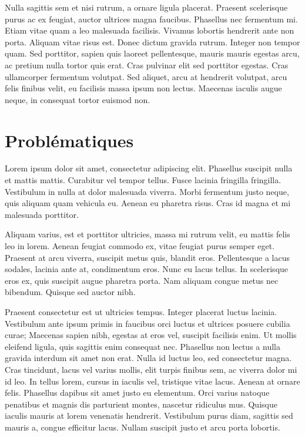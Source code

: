 Nulla sagittis sem et nisi rutrum, a ornare ligula placerat. Praesent scelerisque purus ac ex feugiat, auctor ultrices magna faucibus. 
Phasellus nec fermentum mi. Etiam vitae quam a leo malesuada facilisis. Vivamus lobortis hendrerit ante non porta. 
Aliquam vitae risus est. Donec dictum gravida rutrum. Integer non tempor quam. 
Sed porttitor, sapien quis laoreet pellentesque, mauris mauris egestas arcu, ac pretium nulla tortor quis erat. 
Cras pulvinar elit sed porttitor egestas. Cras ullamcorper fermentum volutpat. 
Sed aliquet, arcu at hendrerit volutpat, arcu felis finibus velit, eu facilisis massa ipsum non lectus. 
Maecenas iaculis augue neque, in consequat tortor euismod non. 

\section{Problématiques}

Lorem ipsum dolor sit amet, consectetur adipiscing elit. Phasellus suscipit nulla et mattis mattis. Curabitur vel tempor tellus. 
Fusce lacinia fringilla fringilla. Vestibulum in nulla at dolor malesuada viverra. Morbi fermentum justo neque, quis aliquam quam vehicula eu. 
Aenean eu pharetra risus. Cras id magna et mi malesuada porttitor.

Aliquam varius, est et porttitor ultricies, massa mi rutrum velit, eu mattis felis leo in lorem. 
Aenean feugiat commodo ex, vitae feugiat purus semper eget. Praesent at arcu viverra, suscipit metus quis, blandit eros. 
Pellentesque a lacus sodales, lacinia ante at, condimentum eros. Nunc eu lacus tellus. In scelerisque eros ex, quis suscipit augue pharetra porta. 
Nam aliquam congue metus nec bibendum. Quisque sed auctor nibh.

Praesent consectetur est ut ultricies tempus. Integer placerat luctus lacinia. 
Vestibulum ante ipsum primis in faucibus orci luctus et ultrices posuere cubilia curae; Maecenas sapien nibh, egestas at eros vel, suscipit facilisis enim. 
Ut mollis eleifend ligula, quis sagittis enim consequat nec. Phasellus non lectus a nulla gravida interdum sit amet non erat. 
Nulla id luctus leo, sed consectetur magna. Cras tincidunt, lacus vel varius mollis, elit turpis finibus sem, ac viverra dolor mi id leo. 
In tellus lorem, cursus in iaculis vel, tristique vitae lacus. Aenean at ornare felis. Phasellus dapibus sit amet justo eu elementum. 
Orci varius natoque penatibus et magnis dis parturient montes, nascetur ridiculus mus. Quisque iaculis mauris at lorem venenatis hendrerit. 
Vestibulum purus diam, sagittis sed mauris a, congue efficitur lacus. Nullam suscipit justo et arcu porta lobortis.

